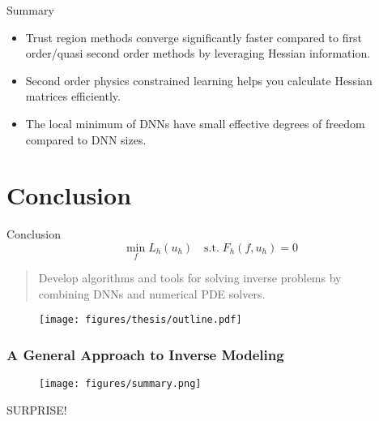 \documentclass[usenames,dvipsnames]{beamer}
\newcommand{\cmark}{\ding{51}}%
\begin{document}
\begin{frame}{Summary}
	\begin{itemize}
\item Trust region methods converge significantly faster compared to first order/quasi second order methods by leveraging Hessian information. 

\item Second order physics constrained learning helps you calculate Hessian matrices efficiently. 

\item The local minimum of DNNs have small effective degrees of freedom compared to DNN sizes. 
	\end{itemize}
\end{frame}


\section{Conclusion}

\begin{frame}{Conclusion}
	$$\min_{{f}} L_h(u_h) \quad \mathrm{s.t.}\; F_h({f}, u_h) = 0$$
	
	\begin{quote}
		\textcolor{green}{\cmark} Develop algorithms and tools for solving inverse problems by \\ combining DNNs and numerical PDE solvers. 
	\end{quote}
	
	
	\begin{figure}[hbt]
		\centering
		\texttt{[image: figures/thesis/outline.pdf]}
	\end{figure}
\end{frame}

\begin{frame}
	\frametitle{A General Approach to Inverse Modeling}
	\begin{figure}[hbt]
		\texttt{[image: figures/summary.png]}
	\end{figure}
\end{frame}

\begin{frame}
SURPRISE!
\end{frame}



\end{document}
